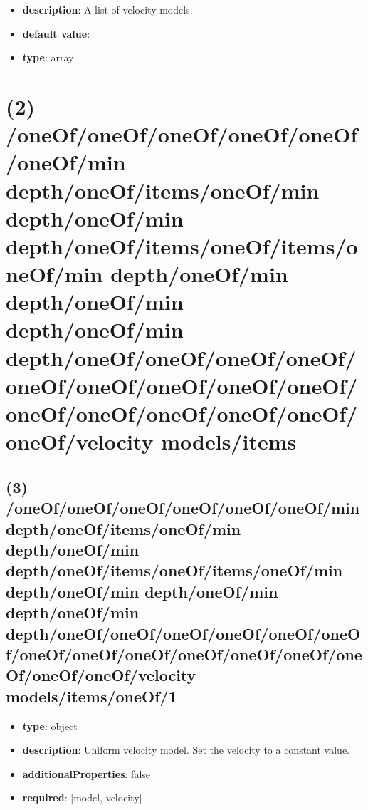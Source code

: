 \begin{itemize}[leftmargin=1em]\item {\bf description}: A list of velocity models.
\item {\bf default value}: 
\item {\bf type}: array
\end{itemize}\section{(2) /oneOf/oneOf/oneOf/oneOf/oneOf/oneOf/min depth/oneOf/items/oneOf/min depth/oneOf/min depth/oneOf/items/oneOf/items/oneOf/min depth/oneOf/min depth/oneOf/min depth/oneOf/min depth/oneOf/oneOf/oneOf/oneOf/oneOf/oneOf/oneOf/oneOf/oneOf/oneOf/oneOf/oneOf/oneOf/oneOf/oneOf/velocity models/items}

\subsection{(3) /oneOf/oneOf/oneOf/oneOf/oneOf/oneOf/min depth/oneOf/items/oneOf/min depth/oneOf/min depth/oneOf/items/oneOf/items/oneOf/min depth/oneOf/min depth/oneOf/min depth/oneOf/min depth/oneOf/oneOf/oneOf/oneOf/oneOf/oneOf/oneOf/oneOf/oneOf/oneOf/oneOf/oneOf/oneOf/oneOf/oneOf/velocity models/items/oneOf/1}
\begin{itemize}[leftmargin=3em]\item {\bf type}: object
\item {\bf description}: Uniform velocity model. Set the velocity to a constant value.
\item {\bf additionalProperties}: false
\item {\bf required}: [model, velocity]\end{itemize}
